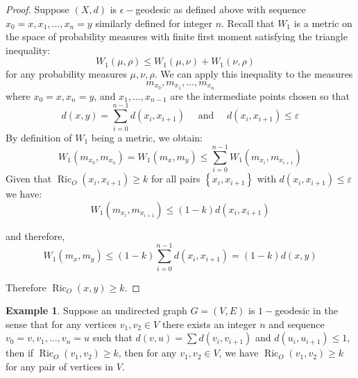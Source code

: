 \documentclass{Dissertate}
\theoremstyle{definition}
\theoremstyle{definition} %
\theoremstyle{definition}
\newtheorem{example}[theorem]{Example}
\begin{document}
\begin{proof} Suppose $(X,d)$ is $\epsilon-$geodesic as defined above with sequence $x_0 = x, x_1,..., x_n = y$ similarly defined for integer $n$.  Recall that $W_1$ is a metric on the space of probability measures with finite first moment satisfying the triangle inequality:
$$W_1(\mu, \rho) \leq W_1(\mu, \nu)+W_1(\nu, \rho) \quad
$$ 
for any probability measures $\mu, \nu, \rho
$. 
We can apply this inequality to the measures
$$
m_{x_0}, m_{x_1}, \ldots, m_{x_n}
$$
where $x_0=x, x_n=y$, and $x_1, \ldots, x_{n-1}$ are the intermediate points chosen so that
$$
d(x, y)=\sum_{i=0}^{n-1} d\left(x_i, x_{i+1}\right) \quad \text { and } \quad d\left(x_i, x_{i+1}\right) \leq \varepsilon
$$
By definition of $W_1$ being a metric, we obtain:
$$
W_1\left(m_{x_0}, m_{x_n}\right)=W_1\left(m_x, m_y\right) \leq \sum_{i=0}^{n-1} W_1\left(m_{x_i}, m_{x_{i+1}}\right)
$$
Given that $\operatorname{Ric}_{O} \left(x_i, x_{i+1}\right) \geq k $ for all pairs $\left\{x_i, x_{i+1}\right\}$ with $d\left(x_i, x_{i+1}\right) \leq \varepsilon$ we have:
$$
W_1\left(m_{x_i}, m_{x_{i+1}}\right) \leq(1-k) d\left(x_i, x_{i+1}\right)
$$

and therefore, 
$$
W_1\left(m_x, m_y\right) \leq(1-k) \sum_{i=0}^{n-1} d\left(x_i, x_{i+1}\right)=(1-k) d(x, y)
$$

Therefore $\operatorname{Ric}_{O}(x, y) \geq k$. 
\end{proof}

\begin{example} Suppose an undirected graph \(G=(V,E)\) is $1-$geodesic in the sense that for any vertices $v_1, v_2 \in V$ there exists an integer $n$ and sequence $v_0 = v, v_1,...,v_n =u$ such that $d(v, u) = \sum d(v_i, v_{i+1})$ and $d(u_i, u_{i+1}) \leq 1$, then if $\operatorname{Ric}_{O}(v_1, v_2) \geq k$, then for any $v_1, v_2 \in V$, we have $\operatorname{Ric}_{O}(v_1, v_2) \geq k$ for any pair of vertices in $V$.
\end{example}
\end{document}
